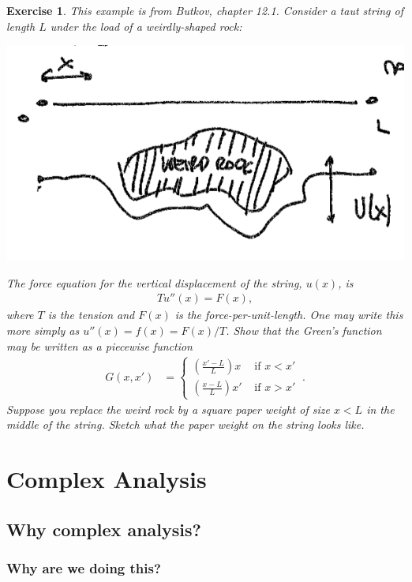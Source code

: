 \documentclass[
  11pt,
	colorful,
	raggedright,
]{tufte-style-thesis-flip}
\newtheorem{exercise}{Exercise}[section]
\begin{document}
\begin{exercise}
This example is from Butkov, chapter 12.1. Consider a taut string of length $L$ under the load of a weirdly-shaped rock:
\begin{center}
\includegraphics[width=.5\textwidth]{figures/lec12_eg.png}
\end{center}
The force equation for the vertical displacement of the string, $u(x)$, is
\begin{align}
  T u''(x) = F(x),
\end{align}
where $T$ is the tension and $F(x)$ is the force-per-unit-length. One may write this more simply as $u''(x) = f(x) = F(x)/T$. Show that the Green's function may be written as a piecewise function
\begin{align}
  G(x,x') &=
  \begin{cases}
  \left(\frac{x'-L}{L}\right)x  & \text{ if } x<x'
  \\
  \left(\frac{x-L}{L}\right)x' & \text{ if } x>x' 
  \end{cases}\ .
\end{align}
Suppose you replace the weird rock by a square paper weight of size $x < L$ in the middle of the string. Sketch what the paper weight on the string looks like.
\end{exercise}



\part{Complex Analysis}

\chapter{Why complex analysis?}

\section{Why are we doing this?}
\end{document}
